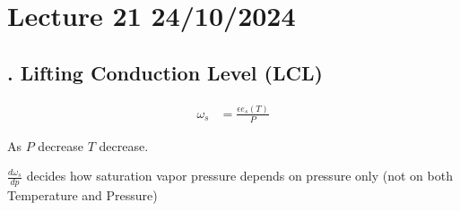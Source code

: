 \documentclass[fleqn,10pt]{SelfArx} %
\begin{document}

\clearpage

\section{Lecture 21 24/10/2024}
\subsection{. Lifting Conduction Level (LCL)}
\begin{align*}
    \omega_s &= \frac{\epsilon e_s(T)}{P}
\end{align*}

As $P$ decrease $T$ decrease.

$\frac{d\omega_s}{dp}$ decides how saturation vapor pressure depends on pressure only (not on both Temperature and Pressure)
\end{document}
